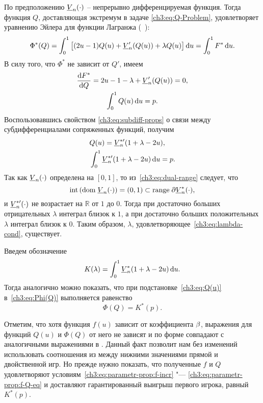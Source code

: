 {По предположению $\LV{n}(\cdot)$ -- непрерывно дифференцируемая функция.
Тогда функция $Q$, доставляющая экстремум в задаче \eqref{ch3:eq:Q-Problem}, удовлетворяет уравнению Эйлера для функции Лагранжа (\seename~\cite{elsgolc69}):
\begin{equation*}
  \Phi^*(Q) =
  \int_0^1 \left[
     (2u - 1) Q(u) + \LV[\prime]{n}(Q(u)) + \lambda Q(u)
   \right] \di u =
  \int_0^1 F^* \di u.
\end{equation*}
В силу того, что $\Phi^*$ не зависит от $Q'$, имеем
\begin{gather*}
  \frac{\di F^*}{\di Q} = 2u - 1 - \lambda + \LV[\prime]{n}(Q(u)) = 0,\\
  \int_0^1 Q(u) \di u = p.
\end{gather*}
Воспользовавшись свойством \eqref{ch3:eq:subdiff-props} о связи между субдифференциалами сопряженных функций, получим
\begin{align}
  \label{ch3:eq:Q(u)}
  &Q(u) = \LV[*\prime]{n}(1+\lambda-2u),\\
  \label{ch3:eq:lambda-cond}
  &\int_0^1 \LV[ *\prime ]{n}(1+\lambda-2u) \di u = p.
\end{align}
Так как $\LV{n}(\cdot)$ определена на $[0, 1]$, то из~\eqref{ch3:eq:dual-range} следует, что
\begin{equation*}
  \mathrm{int} \left( \dom \LV{n}(\cdot) \right)
  = (0, 1)
  \subset \range \partial \LV[*]{n}(\cdot),
\end{equation*}
и $\LV[ *\prime ]{n}(\cdot)$ не возрастает на $\mathbb{R}$ от $1$ до $0$.
Тогда при достаточно больших отрицательных $\lambda$ интеграл близок к $1$, а при достаточно больших положительных $\lambda$ интеграл близок к 0.
Таким образом, $\lambda$, удовлетворяющее~\eqref{ch3:eq:lambda-cond}, существует.

Введем обозначение
\begin{equation*}
  K(\lambda) = \int_0^1 \LV[*]{n}(1+\lambda-2u) \di u.
\end{equation*}
Тогда аналогично \cite{demeyer02} можно показать, что при подстановке~\eqref{ch3:eq:Q(u)} в~\eqref{ch3:eq:Phi(Q)} выполняется равенство
\begin{equation}\label{ch3:eq:phi=k*}
  \Phi(Q) = K^*(p).
\end{equation}

Отметим, что хотя функция $f(u)$ зависит от коэффициента $\beta$, выражения для функций $Q(u)$ и $\Phi(Q)$ от него не зависят и по форме совпадают с аналогичными выражениями в \cite{demeyer02}.
Данный факт позволит нам без изменений использовать соотношения из \cite{demeyer02} между нижними значениями прямой и двойственной игр.
Но прежде нужно показать, что полученные $f$ и $Q$ удовлетворяют условиям~\eqref{ch3:eq:parametr-prop:f-incr} "--- \eqref{ch3:eq:parametr-prop:f-Q-eq} и доставляют гарантированный выигрыш первого игрока, равный $K^*(p)$.

}
